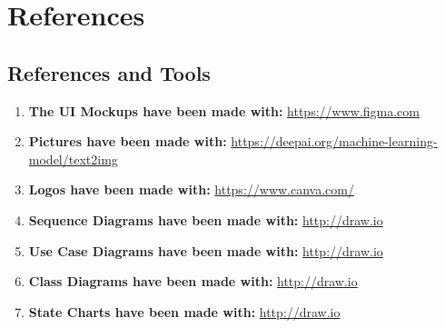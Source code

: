 \documentclass[a4paper,12pt]{article}
\begin{document}
\section{References}
\subsection{References and Tools}
\begin{enumerate}
    \item \textbf{The UI Mockups have been made with:} \url{https://www.figma.com}
    \item \textbf{Pictures have been made with:} \url{https://deepai.org/machine-learning-model/text2img}
    \item \textbf{Logos have been made with:} \url{https://www.canva.com/}
    \item \textbf{Sequence Diagrams have been made with:} \url{http://draw.io}
    \item \textbf{Use Case Diagrams have been made with:} \url{http://draw.io}
    \item \textbf{Class Diagrams have been made with:} \url{http://draw.io}
    \item \textbf{State Charts have been made with:} \url{http://draw.io}
\end{enumerate}

\maketitle
\end{document}
